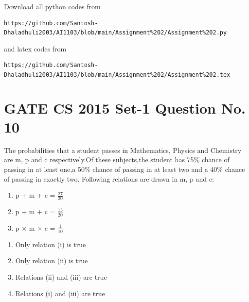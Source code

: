 \documentclass[journal,12pt,twocolumn]{IEEEtran}
\begin{document}
Download all python codes from 
\begin{lstlisting}
https://github.com/Santosh-Dhaladhuli2003/AI1103/blob/main/Assignment%202/Assignment%202.py
\end{lstlisting}
%
and latex codes from 
%
\begin{lstlisting}
https://github.com/Santosh-Dhaladhuli2003/AI1103/blob/main/Assignment%202/Assignment%202.tex
\end{lstlisting}
\section{\textbf{GATE CS 2015 Set-1 Question No. 10}}
The probabilities that a student passes in Mathematics, Physics and Chemistry are m, p and c respectively.Of these subjects,the student has 75$\%$ chance of passing in at least one,a 50$\%$ chance of passing in at least two and a 40$\%$ chance of passing in exactly two. Following relations are drawn in m, p and c:
 \begin{enumerate}[label=(\roman*)]
 \item p + m + c = $\frac{27}{20}$ 
 \item p + m + c = $\frac{13}{20}$ 
 \item p $\times$ m $\times$ c = $\frac{1}{10}$
 \end{enumerate}
 \vspace{0.5cm}
\begin{enumerate}
    \item Only relation (i) is true
    \item Only relation (ii) is true
    \item Relations (ii) and (iii) are true
    \item Relations (i) and (iii) are true
\end{enumerate}
\end{document}
